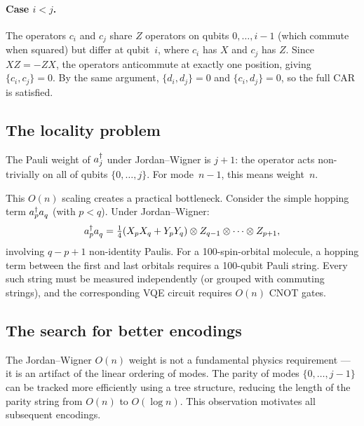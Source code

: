\paragraph{Case $i < j$.}
The operators $c_i$ and $c_j$ share $Z$ operators on qubits
$0, \ldots, i{-}1$ (which commute when squared) but differ at
qubit~$i$, where $c_i$ has $X$ and $c_j$ has $Z$.  Since $XZ = -ZX$,
the operators anticommute at exactly one position, giving
$\{c_i, c_j\} = 0$.  By the same argument, $\{d_i, d_j\} = 0$ and
$\{c_i, d_j\} = 0$, so the full CAR is satisfied.

\subsection{The locality problem}
\label{sec:jw-locality}

The Pauli weight of $a_{j}^{\dagger}$ under Jordan--Wigner is $j + 1$: the
operator acts non-trivially on all of qubits $\{0, \ldots, j\}$.
For mode~$n{-}1$, this means weight~$n$.

This $O(n)$ scaling creates a practical bottleneck.  Consider the
simple hopping term $\ad{p}\an{q}$ (with $p < q$).  Under
Jordan--Wigner:
\begin{equation}
  \ad{p}\an{q} = \tfrac{1}{4}(X_p X_q + Y_p Y_q)
    \otimes Z_{q-1} \otimes \cdots \otimes Z_{p+1},
  \label{eq:jw-hopping}
\end{equation}
involving $q - p + 1$ non-identity Paulis.  For a 100-spin-orbital
molecule, a hopping term between the first and last orbitals requires
a 100-qubit Pauli string.   Every such string must be measured
independently (or grouped with commuting strings), and the
corresponding VQE circuit requires $O(n)$ CNOT gates.

\subsection{The search for better encodings}

The Jordan--Wigner $O(n)$ weight is not a fundamental physics
requirement --- it is an artifact of the linear ordering of modes.
The parity of modes $\{0, \ldots, j{-}1\}$ can be tracked more
efficiently using a tree structure, reducing the length of the
parity string from $O(n)$ to $O(\log n)$.  This observation
motivates all subsequent encodings.

